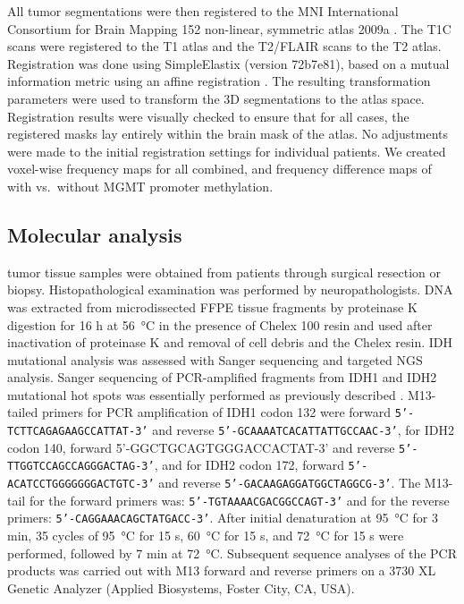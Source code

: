 All \gls{tumor} segmentations were then registered to the \gls{MNI} International Consortium for Brain Mapping 152 non-linear, symmetric atlas 2009a \autocite{fonov2011unbiased, fonov2009unbiased}.
The \gls{T1C} scans were registered to the \acrlong{T1} atlas and the \gls{T2}/\gls{FLAIR} scans to the \gls{T2} atlas.
Registration was done using SimpleElastix (version 72b7e81), based on a mutual information metric using an affine registration \autocite{marstal2016simpleelastix}.
The resulting transformation parameters were used to transform the 3D segmentations to the atlas space.
Registration results were visually checked to ensure that for all cases, the registered masks lay entirely within the brain mask of the atlas.
No adjustments were made to the initial registration settings for individual patients.
We created voxel-wise frequency maps for all  combined, and frequency difference maps of  with vs.\ without \gls{MGMT} promoter methylation.

\subsection{Molecular analysis}

\Gls{tumor} tissue samples were obtained from patients through surgical resection or biopsy.
Histopathological examination was performed by neuropathologists.
DNA was extracted from microdissected \gls{FFPE} tissue fragments by proteinase K digestion for 16 h at \SI{56}{\celsius} in the presence of  Chelex 100 resin and used after inactivation of proteinase K and removal of cell debris and the Chelex resin.
\gls{IDH} mutational analysis was assessed with Sanger sequencing and targeted \gls{NGS} analysis.
Sanger sequencing of PCR-amplified fragments from \gls{IDH}1 and \gls{IDH}2 mutational hot spots was essentially performed as previously described \autocite{vandenbent2013interlaboratory}.
M13-tailed primers for PCR amplification of IDH1 codon 132 were forward \texttt{5'-TCTTCAGAGAAGCCATTAT-3'} and reverse \texttt{5'-GCAAAATCACATTATTGCCAAC-3'}, for IDH2 codon 140, forward {5'-GGCTGCAGTGGGACCACTAT-3'} and reverse \texttt{5'-TTGGTCCAGCCAGGGACTAG-3'}, and for IDH2 codon 172, forward \linebreak[4]\texttt{5'-ACATCCTGGGGGGGACTGTC-3'} and reverse \texttt{5'-GACAAGAGGATGGCTAGGCG-3'}.
The M13-tail for the forward primers was: \texttt{5'-TGTAAAACGACGGCCAGT-3'} and for the reverse primers: \texttt{5'-CAGGAAACAGCTATGACC-3'}.
After initial denaturation at \SI{95}{\celsius} for 3 min, 35 cycles of \SI{95}{\celsius} for 15 s, \SI{60}{\celsius} for 15 s, and \SI{72}{\celsius} for 15 s were performed, followed by 7 min at \SI{72}{\celsius}.
Subsequent sequence analyses of the PCR products was carried out with M13 forward and reverse primers on a 3730 XL Genetic Analyzer (Applied Biosystems, Foster City, CA, USA).

